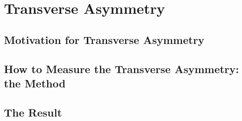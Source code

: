 \chapter{Transverse Asymmetry}
\section{Motivation for Transverse Asymmetry}

\section{How to Measure the Transverse Asymmetry: the Method}

\section{The Result}


